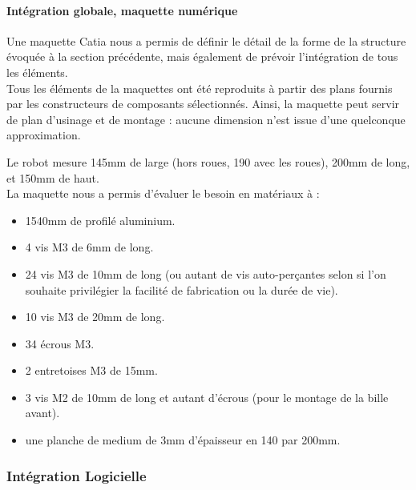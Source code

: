 		\paragraph{Intégration globale, maquette numérique}

			Une maquette Catia nous a permis de définir le détail de la forme de la structure évoquée à la section précédente, mais également de prévoir l'intégration de tous les éléments.\\

			Tous les éléments de la maquettes ont été reproduits à partir des plans fournis par les constructeurs de composants sélectionnés. Ainsi, la maquette peut servir de plan d'usinage et de montage : aucune dimension n'est issue d'une quelconque approximation.

			\vspace{30pt}


			Le robot mesure 145mm de large (hors roues, 190 avec les roues), 200mm de long, et 150mm de haut.\\

			La maquette nous a permis d'évaluer le besoin en matériaux à :

			\begin{itemize}
				\item 1540mm de profilé aluminium.
				\item 4 vis M3 de 6mm de long.
				\item 24 vis M3 de 10mm de long (ou autant de vis auto-perçantes selon si l'on souhaite privilégier la facilité de fabrication ou la durée de vie).
				\item 10 vis M3 de 20mm de long.
				\item 34 écrous M3.
				\item 2 entretoises M3 de 15mm.
				\item 3 vis M2 de 10mm de long et autant d'écrous (pour le montage de la bille avant).
				\item une planche de medium de 3mm d'épaisseur en 140 par 200mm.
			\end{itemize}

	\subsubsection{Intégration Logicielle}\label{integrationLogicielle}

